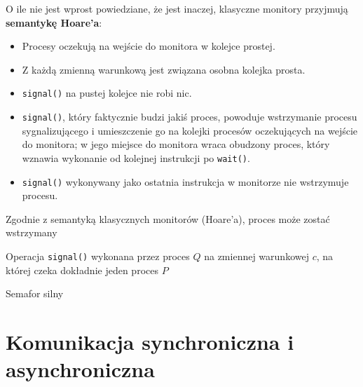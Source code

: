 O ile nie jest wprost powiedziane, że jest inaczej, klasyczne monitory przyjmują \textbf{semantykę Hoare'a}:
\begin{itemize}
    \item Procesy oczekują na wejście do monitora w kolejce prostej.
    \item Z każdą zmienną warunkową jest związana osobna kolejka prosta.
    \item \texttt{signal()} na pustej kolejce nie robi nic.
    \item \texttt{signal()}, który faktycznie budzi jakiś proces, powoduje wstrzymanie procesu sygnalizującego i umieszczenie go na  kolejki procesów oczekujących na wejście do monitora; w jego miejsce do monitora wraca obudzony proces, który wznawia wykonanie od kolejnej instrukcji po \texttt{wait()}.
    \item \texttt{signal()} wykonywany jako ostatnia instrukcja w monitorze nie wstrzymuje procesu.
\end{itemize}

\begin{problems}
    \prob Zgodnie z semantyką klasycznych monitorów (Hoare'a), proces może zostać wstrzymany
    
    \prob Operacja \texttt{signal()} wykonana przez proces $Q$ na zmiennej warunkowej $c$, na której czeka dokładnie jeden proces $P$

    \prob Semafor silny
\end{problems}

\section{Komunikacja synchroniczna i asynchroniczna}


